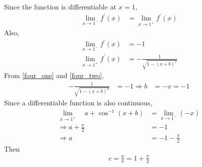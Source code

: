 Since the function is differentiable at $x=1$,
\begin{align}
\label{four_one}
\lim _{ x\rightarrow { 1 }^{ - } }{ f^{ \prime  }\left( x \right)  }  &= \lim _{ x\rightarrow { 1 }^{ + } }{ f^{ \prime  }\left(x \right)  }
\end{align}
Also,
%
\begin{align}
\label{four_two}
 \lim _{ x\rightarrow { 1 }^{ - } }{ f^{ \prime  }\left( x \right)  } &=-1 \\ 
\lim _{ x\rightarrow { 1 }^{ + } }{ f^{ \prime  }\left(x \right)  } &= -\frac { 1 }{ \sqrt { 1-{ (x+b) }^{ 2 } }  } 
\end{align}
%
From \eqref{four_one} and \eqref{four_two},
\begin{align}
-\frac { 1 }{ \sqrt { 1-{ (x+b) }^{ 2 } }} &= -1 \Rightarrow 
b &=-x = -1
\end{align}
Since a differentiable function is also continuous, 
\begin{align}
\lim _{ x\rightarrow { 1 }^{ + } }{ \quad a+\cos ^{ -1 }{ (x+b) }  } &= \lim _{ x\rightarrow { 1 }^{ - } }{ (-x) }  \\
\Rightarrow a+\frac { \pi  }{ 2 } &=-1\\
\Rightarrow a &=-1-\frac { \pi  }{ 2 }
\end{align}
Then
\begin{align}
  c=\frac{a}{b}=1+\frac { \pi  }{ 2 } 
\end{align}

